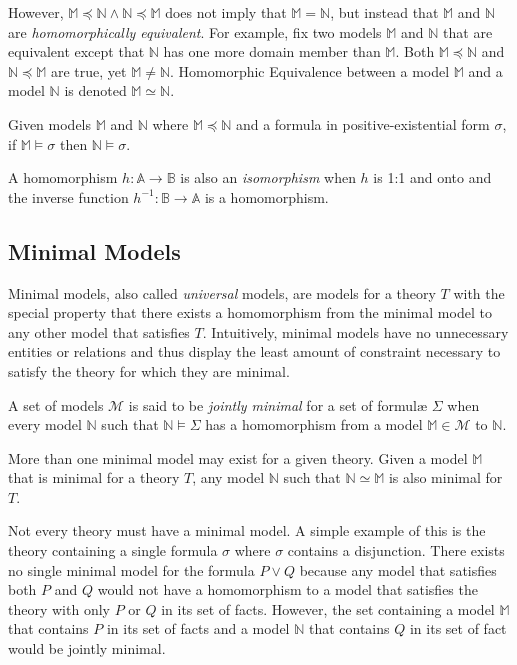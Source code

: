 		However, $\mathbb{M} \preceq \mathbb{N} \wedge \mathbb{N} \preceq
		\mathbb{M}$ does not imply that $\mathbb{M} = \mathbb{N}$, but instead
		that $\mathbb{M}$ and $\mathbb{N}$ are \emph{homomorphically
		equivalent}. For example, fix two models $\mathbb{M}$ and $\mathbb{N}$
		that are equivalent except that $\mathbb{N}$ has one more domain
		member than $\mathbb{M}$. Both $\mathbb{M} \preceq \mathbb{N}$ and
		$\mathbb{N} \preceq \mathbb{M}$ are true, yet $\mathbb{M} \neq
		\mathbb{N}$. Homomorphic Equivalence between a model $\mathbb{M}$ and a
		model $\mathbb{N}$ is denoted $\mathbb{M} \simeq \mathbb{N}$.

		Given models $\mathbb{M}$ and $\mathbb{N}$ where $\mathbb{M} \preceq
		\mathbb{N}$ and a formula in positive-existential form $\sigma$, if
		$\mathbb{M} \models \sigma$ then $\mathbb{N} \models \sigma$.

		A homomorphism $h : \mathbb{A} \to \mathbb{B}$ is also an
		\emph{isomorphism} when $h$ is 1:1 and onto and the inverse function
		$h^{-1} : \mathbb{B} \to \mathbb{A}$ is a homomorphism.

	\subsection{Minimal Models}

		Minimal models, also called \emph{universal} models, are models for a
		theory $T$ with the special property that there exists a homomorphism from
		the minimal model to any other model that satisfies $T$. Intuitively,
		minimal models have no unnecessary entities or relations and thus
		display the least amount of constraint necessary to satisfy the theory
		for which they are minimal.

		A set of models $\mathcal{M}$ is said to be \emph{jointly minimal} for
		a set of formul{\ae} $\Sigma$ when every model $\mathbb{N}$ such that
		$\mathbb{N} \models \Sigma$ has a homomorphism from a model $\mathbb{M}
		\in \mathcal{M}$ to $\mathbb{N}$.

		More than one minimal model may exist for a given theory. Given a model
		$\mathbb{M}$ that is minimal for a theory $T$, any model $\mathbb{N}$
		such that $\mathbb{N} \simeq \mathbb{M}$ is also minimal for $T$.

		Not every theory must have a minimal model. A simple example of this is
		the theory containing a single formula $\sigma$ where $\sigma$ contains
		a disjunction. There exists no single minimal model for the formula $P
		\vee Q$ because any model that satisfies both $P$ and $Q$ would not
		have a homomorphism to a model that satisfies the theory with only $P$
		or $Q$ in its set of facts. However, the set containing a model
		$\mathbb{M}$ that contains $P$ in its set of facts and a model
		$\mathbb{N}$ that contains $Q$ in its set of fact would be jointly
		minimal.

